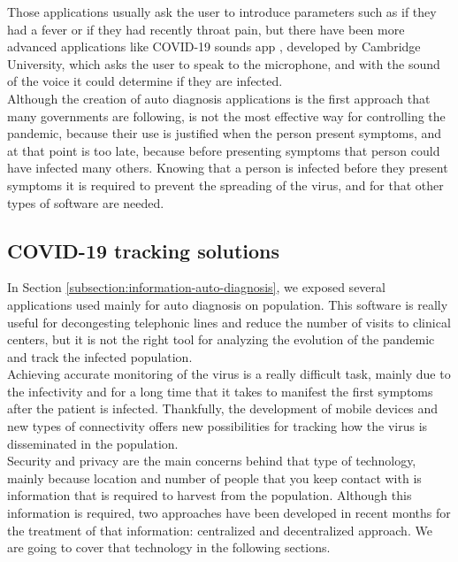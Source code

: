 \documentclass[a4paper, 12pt]{article}
\begin{document}
Those applications usually ask the user to introduce parameters such as if they had a fever or if they had recently throat pain, but there have been more advanced applications like COVID-19 sounds app \cite{covid19-cambridge}, developed by Cambridge University, which asks the user to speak to the microphone, and with the sound of the voice it could determine if they are infected. \\

Although the creation of auto diagnosis applications is the first approach that many governments are following, is not the most effective way for controlling the pandemic, because their use is justified when the person present symptoms, and at that point is too late, because before presenting symptoms that person could have infected many others. Knowing that a person is infected before they present symptoms it is required to prevent the spreading of the virus, and for that other types of software are needed.

\subsection{COVID-19 tracking solutions}
\label{subsection:covid-19-tracking}

In Section \ref{subsection:information-auto-diagnosis}, we exposed several applications used mainly for auto diagnosis on population. This software is really useful for decongesting telephonic lines and reduce the number of visits to clinical centers, but it is not the right tool for analyzing the evolution of the pandemic and track the infected population.\\

Achieving accurate monitoring of the virus is a really difficult task, mainly due to the infectivity and for a long time that it takes to manifest the first symptoms after the patient is infected. Thankfully, the development of mobile devices and new types of connectivity offers new possibilities for tracking how the virus is disseminated in the population. \\

Security and privacy are the main concerns behind that type of technology, mainly because location and number of people that you keep contact with is information that is required to harvest from the population. Although this information is required, two approaches have been developed in recent months for the treatment of that information: centralized and decentralized approach. We are going to cover that technology in the following sections. \\
\end{document}
